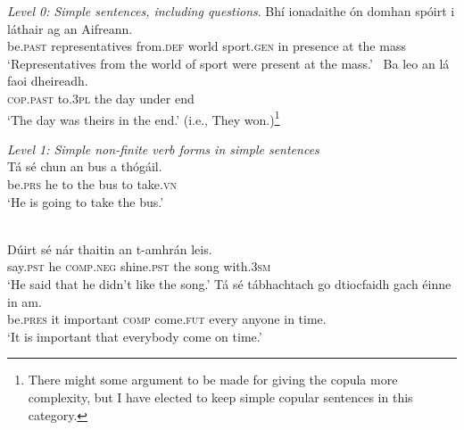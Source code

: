 \documentclass[output=paper,colorlinks,citecolor=brown]{langscibook}
\begin{document}
\ea\label{ex.level0} {\textit{Level 0: Simple sentences, including questions}.}
\ea
\gll Bhí ionadaithe ón domhan spóirt i láthair ag an Aifreann.\\
be.\textsc{past} representatives from.\textsc{def} world sport.\textsc{gen} in presence at the mass\\
\glt ‘Representatives from the world of sport were present at the mass.’
\ex\
\gll Ba leo an lá faoi dheireadh.\\
\textsc{cop.\textsc{past}} to.\textsc{3pl} the day under end\\
\glt ‘The day was theirs in the end.’ (i.e., They won.)\footnote{There might some argument to be made for giving the copula more complexity, but I have elected to keep simple copular sentences in this category.}
\z
\z

\ea\label{ex.level1} {\textit{Level 1:  Simple non-finite verb forms in simple sentences}}\\
\gll Tá sé chun an bus a thógáil.\\
be.\textsc{prs} he to the bus to take.\textsc{vn}{\footnotemark}\\
\glt ‘He is going to take the bus.’
\z


\\
\ea
\gll Dúirt sé nár thaitin an t-amhrán leis.\\
say.\textsc{pst} he \textsc{comp.neg} shine.\textsc{pst} the song with.\textsc{3sm}\\
\glt ‘He said that he didn't like the song.’
\ex
\gll Tá sé tábhachtach go dtiocfaidh gach éinne in am.\\
be.\textsc{pres} it important \textsc{comp} come.\textsc{fut} every anyone in time.\\
\glt ‘It is important that everybody come on time.’
\z
\z
\end{document}
